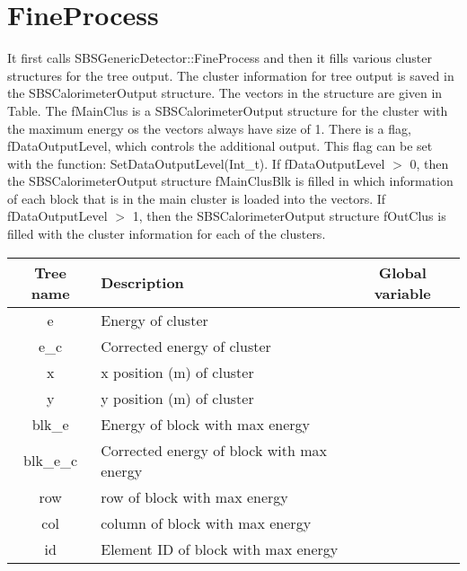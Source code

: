 \documentclass[11pt]{article}
\begin{document}
\section{FineProcess}
It first calls SBSGenericDetector::FineProcess and then it fills
various cluster structures for the tree output.
The cluster information for tree output is saved in the SBSCalorimeterOutput structure.
The vectors in the structure are given in Table.
The fMainClus is a  SBSCalorimeterOutput structure for the cluster with the maximum energy
os the vectors always have size of 1. There is a flag, fDataOutputLevel, which controls the
additional output. This flag can be set with the function: SetDataOutputLevel(Int\_t).
If fDataOutputLevel $>$ 0, then the SBSCalorimeterOutput structure fMainClusBlk is filled
in which information of each block that is in the main cluster is loaded into the vectors.
If fDataOutputLevel $>$ 1, then  the SBSCalorimeterOutput structure fOutClus is filled with
the cluster information for each of the clusters.

\begin{table}[h]
	\begin{center}
		\begin{tabularx}{\textwidth}{|c|X|c|}
			\hline 
Tree name	& Description &  Global variable\\ 
\hline
e & Energy of cluster &  \\
\hline
e\_c & Corrected energy of cluster & \\
\hline
x & x position (m) of cluster & \\
\hline
y & y position (m) of cluster & \\
\hline
blk\_e & Energy of block with max energy &  \\
\hline
blk\_e\_c & Corrected energy of block with max energy  & \\
\hline
row 	& row of block with max energy & \\	    
\hline
col 	& column of block with max energy & \\	    
\hline
id 	& Element ID  of block with max energy & \\	    
\hline
\end{tabularx} 
\end{center}
\end{table}
\end{document}
